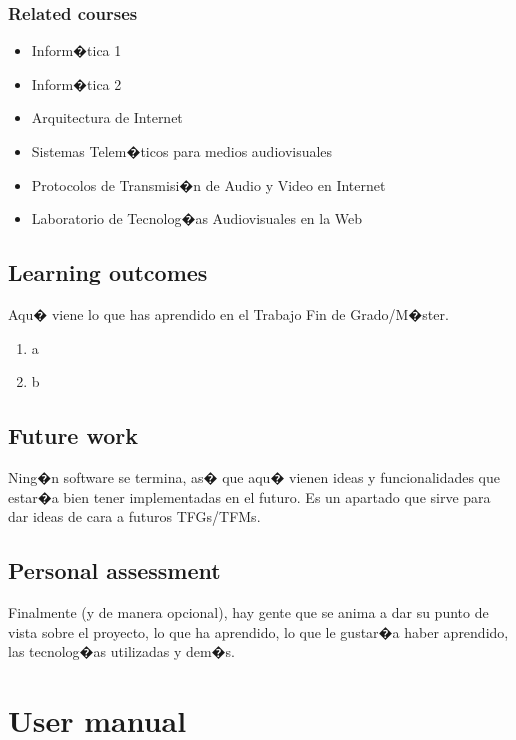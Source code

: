 \documentclass[a4paper, 12pt]{book}
\begin{document}
\subsection{Related courses}
\begin{itemize}
  \item Inform�tica 1
  \item Inform�tica 2
  \item Arquitectura de Internet
  \item Sistemas Telem�ticos para medios audiovisuales
  \item Protocolos de Transmisi�n de Audio y Video en Internet
  \item Laboratorio de Tecnolog�as Audiovisuales en la Web
\end{itemize}
\section{Learning outcomes}
\label{sec:lecciones_aprendidas}
Aqu� viene lo que has aprendido en el Trabajo Fin de Grado/M�ster.
\begin{enumerate}
  \item a
  \item b
\end{enumerate}
\section{Future work}
\label{sec:trabajos_futuros}
Ning�n software se termina, as� que aqu� vienen ideas y funcionalidades
que estar�a bien tener implementadas en el futuro.
Es un apartado que sirve para dar ideas de cara a futuros TFGs/TFMs.
\section{Personal assessment}
\label{sec:valoracion}
Finalmente (y de manera opcional), hay gente que se anima a dar su punto de
vista sobre el proyecto, lo que ha aprendido, lo que le gustar�a haber aprendido,
las tecnolog�as utilizadas y dem�s.
\cleardoublepage
\appendix
\chapter{User manual}
\label{app:manual}
\end{document}
